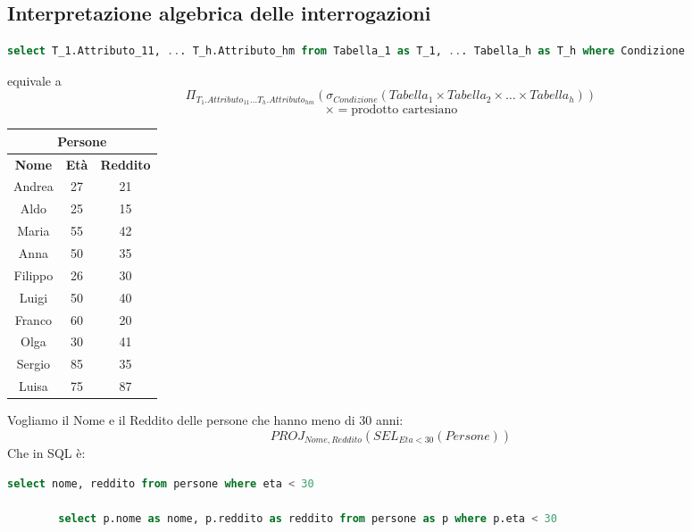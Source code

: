 \documentclass{article}
\begin{document}
	\subsection{Interpretazione algebrica delle interrogazioni}
	\begin{lstlisting}[language=SQL]
		select T_1.Attributo_11, ... T_h.Attributo_hm from Tabella_1 as T_1, ... Tabella_h as T_h where Condizione
	\end{lstlisting}
	equivale a
	\[\Pi_{T_1.Attributo_{11} \dots T_h.Attributo_{hm}} (\sigma_{Condizione} (Tabella_1 \times Tabella_2 \times \dots \times Tabella_h) )\]
	\[\times = \text{prodotto cartesiano}\]
	\begin{center}
		\begin{tabular}{ |c|c|c| }
			\hline
			\multicolumn{3}{|c|}{Persone}\\
			\hline
			\textbf{Nome} & \textbf{Età} & \textbf{Reddito}\\
			\hline
			Andrea & 27 & 21\\
			Aldo & 25 & 15\\
			Maria & 55 & 42\\
			Anna & 50 & 35\\
			Filippo & 26 & 30\\
			Luigi & 50 & 40\\
			Franco & 60 & 20\\
			Olga & 30 & 41\\
			Sergio & 85 & 35\\
			Luisa & 75 & 87\\
			\hline
		\end{tabular}
	\end{center}
	Vogliamo il Nome e il Reddito delle persone che hanno meno di 30 anni:
	\[PROJ_{Nome,Reddito} (SEL_{Eta < 30} (Persone))\]
	Che in SQL è:
	\begin{lstlisting}[language=SQL]
		select nome, reddito from persone where eta < 30
		
		select p.nome as nome, p.reddito as reddito from persone as p where p.eta < 30
	\end{lstlisting}
\end{document}
